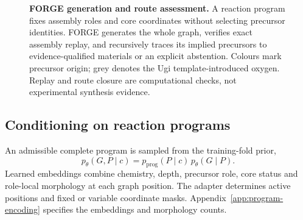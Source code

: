 \documentclass{article}
\theoremstyle{definition}
\begin{document}
\begin{figure}[htbp]
{\relax{}}
\caption{\textbf{FORGE generation and route assessment.}
A reaction program fixes assembly roles and core coordinates without selecting precursor identities.
FORGE generates the whole graph, verifies exact assembly replay, and recursively traces its implied
precursors to evidence-qualified materials or an explicit abstention. Colours mark precursor origin;
grey denotes the Ugi template-introduced oxygen. Replay and route closure are computational checks,
not experimental synthesis evidence.}
\label{fig:forge-overview}
\end{figure}

\subsection{Conditioning on reaction programs}
\label{sec:program-conditioning}
An admissible complete program is sampled from the training-fold prior,
\begin{equation}
    p_\theta(G,P\mid c)=p_{\mathrm{prog}}(P\mid c)\,p_\theta(G\mid P).
\end{equation}
Learned embeddings combine chemistry, depth, precursor role, core status and role-local morphology
at each graph position. The adapter determines active positions and fixed or variable coordinate
masks. Appendix~\ref{app:program-encoding} specifies the embeddings and morphology counts.
\end{document}

